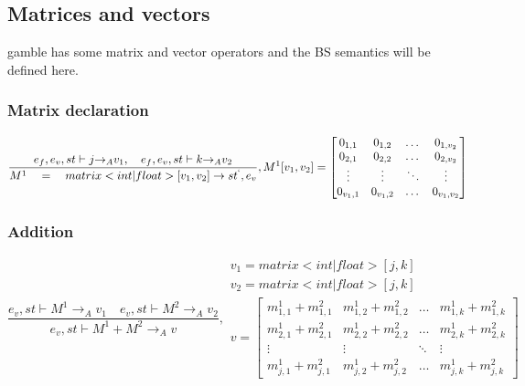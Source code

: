 \subsection*{Matrices and vectors} 
\gls{gamble} has some matrix and vector operators and the BS semantics will be defined here.

\subsubsection{Matrix declaration}
\begin{equation}
	\frac { { e }_{ f },{ e }_{ v },st\vdash j{ \rightarrow  }_{ A }{ v }_{ 1 },\quad { e }_{ f },{ e }_{ v },st\vdash k{ \rightarrow  }_{ A }{ v }_{ 2 } }{ { M }^{ 1 }\quad =\quad matrix<int|float>[{ v }_{ 1 },{ v }_{ 2 }]\rightarrow { st }^{ ` },{ e }_{ v } } ,{ M }^{ 1 }[{ v }_{ 1 },{ v }_{ 2 }]=\begin{bmatrix} { { 0 }_{ 1,1 } } & 0_{ 1,2 } & \dots  & { 0 }_{ { 1,{ v }_{ 2 } } } \\ 0_{ 2,1 } & 0_{ 2,2 } & \dots  & 0_{ 2,v_{ 2 } } \\ \vdots  & \vdots  & \ddots  & \vdots  \\ { 0 }_{ { v }_{ 1 },1 } & 0_{ v_{ 1 },2 } & \dots  & { 0 }_{ { v }_{ 1 },{ v }_{ 2 } } \end{bmatrix}
\end{equation}

\subsubsection{Addition}
\begin{equation}
	\frac { { e }_{ v },st\vdash { M }^{ 1 }{ \rightarrow  }_{ A }{ v }_{ 1 }\quad { e }_{ v },st\vdash { M }^{ 2 }{ \rightarrow  }_{ A }{ v }_{ 2 } }{ { e }_{ v },st\vdash { M }^{ 1 }+{ M }^{ 2 }{ \rightarrow  }_{ A }{ v } } ,\begin{matrix} { v }_{ 1 }=matrix<int|float>[j,k] \\ { v }_{ 2 }=matrix<int|float>[j,k] \\ v=\begin{bmatrix} { { m }_{ 1,1 }^{ 1 } } +{ { m }_{ 1,1 }^{ 2 } } & { { m }_{ 1,2 }^{ 1 } } + { { m }_{ 1,2 }^{ 2 } } & \dots  & { m }_{ 1,k }^{ 1 }+{ { m }_{ 1,k }^{ 2} } \\
{ { m }_{ 2,1 }^{ 1 } } + { { m }_{ 2,1 }^{ 2 } } &  { { m }_{ 2,2 }^{ 1 } } +{ { m }_{ 2,2 }^{ 2 } } & \dots & { { m }_{ 2,k }^{ 1 } } + { { m }_{ 2,k }^{ 2 } }
\\ \vdots  & \vdots & \ddots  & \vdots \\
 { m }_{ j,1 }^{ 1 } +{ { m }_{ j,1 }^{ 2 } } & { { m }_{ j,2 }^{ 1 } } +{ { m }_{ j,2 }^{ 2 } }  & \dots & { m }_{ j,k }^{ 1 }+{ { m }_{ j,k }^{ 2 } } \end{bmatrix}

 \end{matrix}
\end{equation}


